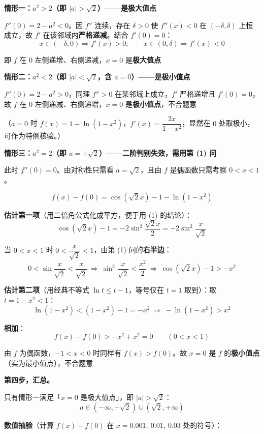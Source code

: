 \textbf{情形一：$a^{2}>2$（即 $|a|>\sqrt2$）——是极大值点 }

$f''(0)=2-a^{2}<0$。因 $f''$ 连续，存在 $\delta>0$ 使 $f''(x)<0$ 在 $(-\delta,\delta)$ 上恒成立，故 $f'$ 在该邻域内\textbf{严格递减}。结合 $f'(0)=0$：
\[x\in(-\delta,0)\Rightarrow f'(x)>0;\qquad x\in(0,\delta)\Rightarrow f'(x)<0\]

即 $f$ 在 $0$ 左侧递增、右侧递减，$x=0$ 是\textbf{极大值点} 

\textbf{情形二：$a^{2}<2$（即 $|a|<\sqrt2$，含 $a=0$）——是极小值点 }

$f''(0)=2-a^{2}>0$，同理 $f''>0$ 在某邻域上成立，$f'$ 严格递增且 $f'(0)=0$，故 $f$ 在 $0$ 左侧递减、右侧递增，$x=0$ 是\textbf{极小值点}，不合题意 

（$a=0$ 时 $f(x)=1-\ln\left(1-x^{2}\right)$，$f'(x)=\dfrac{2x}{1-x^{2}}$，显然在 $0$ 处取极小，可作为特例核验。）

\textbf{情形三：$a^{2}=2$（即 $a=\pm\sqrt2$）——二阶判别失效，需用第 (1) 问 }

此时 $f''(0)=0$。由对称性只需看 $a=\sqrt2$，且由 $f$ 是偶函数只需考察 $0<x<1$。

\[f(x)-f(0)=\cos\left(\sqrt2x\right)-1-\ln\left(1-x^{2}\right)\]

\textbf{估计第一项}（用二倍角公式化成平方，便于用 (1) 的结论）：
\[\cos\left(\sqrt2x\right)-1=-2\sin^{2}\frac{\sqrt2x}2=-2\sin^{2}\frac x{\sqrt2}\]

当 $0<x<1$ 时 $0<\dfrac x{\sqrt2}<1$，由第 (1) 问的\textbf{右半边}：
\[0<\sin\frac x{\sqrt2}<\frac x{\sqrt2}\ \Longrightarrow\ \sin^{2}\frac x{\sqrt2}<\frac{x^{2}}2\ \Longrightarrow\ \cos\left(\sqrt2x\right)-1>-x^{2}\]

\textbf{估计第二项}（用经典不等式 $\ln t\le t-1$，等号仅在 $t=1$ 取到）：取 $t=1-x^{2}<1$：
\[\ln\left(1-x^{2}\right)<\left(1-x^{2}\right)-1=-x^{2}\ \Longrightarrow\ -\ln\left(1-x^{2}\right)>x^{2}\]

\textbf{相加}：
\[f(x)-f(0)>-x^{2}+x^{2}=0\qquad(0<x<1)\]

由 $f$ 为偶函数，$-1<x<0$ 时同样有 $f(x)>f(0)$。故 $x=0$ 是 $f$ 的\textbf{极小值点}（实为最小值点），不合题意 

\textbf{第四步，汇总。}

只有情形一满足「$x=0$ 是极大值点」，即 $|a|>\sqrt2$：
\[\boxed{a\in\left(-\infty,-\sqrt2\right)\cup\left(\sqrt2,+\infty\right)}\]

\textbf{数值抽验}（计算 $f(x)-f(0)$ 在 $x=0.001,\ 0.01,\ 0.03$ 处的符号）：

